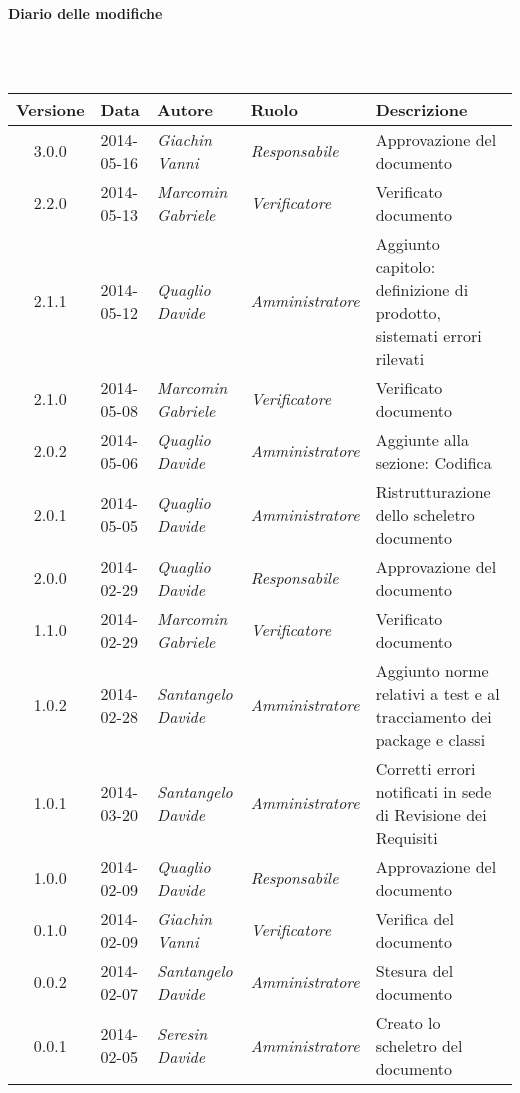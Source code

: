 \noindent\begin{Large}\textbf{Diario delle modifiche}\end{Large}\\
\\
\begin{small}
\begin{tabular}{|c|p{1.8cm}|p{2.8cm}|p{2.8cm}|p{3.5cm}|}
\hline
Versione & Data & Autore & Ruolo & Descrizione \\
\hline
3.0.0 & 2014-05-16 & 
\textit{Giachin Vanni} &
\textit{Responsabile} & Approvazione del documento\\
\hline
2.2.0 & 2014-05-13 & 
\textit{Marcomin Gabriele} &
\textit{Verificatore} & Verificato documento\\
\hline
2.1.1 & 2014-05-12 & 
\textit{Quaglio Davide} &
\textit{Amministratore} & Aggiunto capitolo: definizione di prodotto, sistemati errori rilevati\\
\hline
2.1.0 & 2014-05-08 & 
\textit{Marcomin Gabriele} &
\textit{Verificatore} & Verificato documento\\
\hline
2.0.2 & 2014-05-06 & 
\textit{Quaglio Davide} &
\textit{Amministratore} & Aggiunte alla sezione: Codifica\\
\hline
2.0.1 & 2014-05-05 & 
\textit{Quaglio Davide} &
\textit{Amministratore} & Ristrutturazione dello scheletro documento\\
\hline
2.0.0 & 2014-02-29 & 
\textit{Quaglio Davide} &
\textit{Responsabile} & Approvazione del documento\\
\hline
1.1.0 & 2014-02-29 & 
\textit{Marcomin Gabriele} &
\textit{Verificatore} & Verificato documento\\
\hline
1.0.2 & 2014-02-28 & 
\textit{Santangelo Davide} &
\textit{Amministratore} &  Aggiunto norme relativi a test e al tracciamento dei package e classi\\
\hline
1.0.1 & 2014-03-20 & 
\textit{Santangelo Davide} &
\textit{Amministratore} &  Corretti errori notificati in sede di Revisione dei Requisiti\\
\hline
1.0.0 & 2014-02-09 & 
\textit{Quaglio Davide} &
\textit{Responsabile} &  Approvazione del documento\\
\hline
0.1.0 & 2014-02-09 & 
\textit{Giachin Vanni} &
\textit{Verificatore} &  Verifica del documento\\
\hline
0.0.2 & 2014-02-07 & 
\textit{Santangelo Davide} &
\textit{Amministratore} &  Stesura del documento\\
\hline
0.0.1 & 2014-02-05 & 
\textit{Seresin Davide} &
\textit{Amministratore} &  Creato lo scheletro del documento\\
\hline
\end{tabular}\\
\end{small}